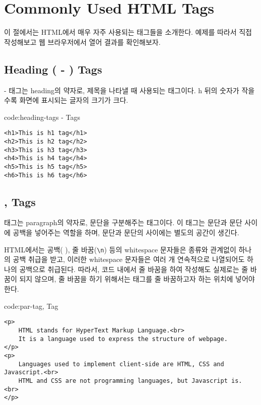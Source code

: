 \section{Commonly Used HTML Tags}\label{sect:commonly-used-html-tags}

이 절에서는 HTML에서 매우 자주 사용되는 태그들을 소개한다. 예제를 따라서 직접 작성해보고 웹 브라우저에서 열어 결과를 확인해보자.

\subsection*{Heading ( - ) Tags}
 -  태그는 heading의 약자로, 제목을 나타낼 때 사용되는 태그이다. h 뒤의 숫자가 작을수록 화면에 표시되는 글자의 크기가 크다.

\begin{codeenv}{code:heading-tags}{ -  Tags}\begin{verbatim}
<h1>This is h1 tag</h1>
<h2>This is h2 tag</h2>
<h3>This is h3 tag</h3>
<h4>This is h4 tag</h4>
<h5>This is h5 tag</h5>
<h6>This is h6 tag</h6>
\end{verbatim}
\end{codeenv}

\subsection*{,  Tags}
 태그는 paragraph의 약자로, 문단을 구분해주는 태그이다. 이 태그는 문단과 문단 사이에 공백을 넣어주는 역할을 하며, 문단과 문단의 사이에는 별도의 공간이 생긴다.

HTML에서는 공백( ), 줄 바꿈(\verb|\n|) 등의 whitespace 문자들은 종류와 관계없이 하나의 공백 취급을 받고, 이러한 whitespace 문자들은 여러 개 연속적으로 나열되어도 하나의 공백으로 취급된다. 따라서, 코드 내에서 줄 바꿈을 하여 작성해도 실제로는 줄 바꿈이 되지 않으며, 줄 바꿈을 하기 위해서는  태그를 줄 바꿈하고자 하는 위치에 넣어야 한다.

\begin{codeenv}{code:par-tag}{,  Tag}\begin{verbatim}
<p>
    HTML stands for HyperText Markup Language.<br>
    It is a language used to express the structure of webpage.
</p>
<p>
    Languages used to implement client-side are HTML, CSS and Javascript.<br>
    HTML and CSS are not programming languages, but Javascript is. <br>
</p>
\end{verbatim}
\end{codeenv}

